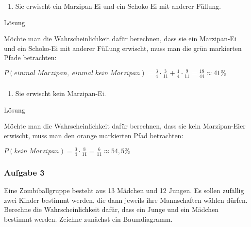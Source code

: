 \documentclass[
  ngerman,
]{book}
\providecommand{\tightlist}{%
  \setlength{\itemsep}{0pt}\setlength{\parskip}{0pt}}
\begin{document}
\begin{enumerate}
\def\labelenumi{\alph{enumi})}
\setcounter{enumi}{1}
\tightlist
\item
  Sie erwischt ein Marzipan-Ei und ein Schoko-Ei mit anderer Füllung.
\end{enumerate}

Lösung

Möchte man die Wahrscheinlichkeit dafür berechnen, dass sie ein Marzipan-Ei und ein Schoko-Ei mit anderer Füllung erwischt, muss man die grün markierten Pfade betrachten:

\(P(einmal\;Marzipan,\;einmal\;kein\;Marzipan)= \frac{3}{4} \cdot \frac{3}{11} + \frac{1}{4} \cdot \frac{9}{11} = \frac{18}{44} \approx 41\%\)

\hypertarget{section-139}{%
\subsubsection*{}\label{section-139}}

\begin{enumerate}
\def\labelenumi{\alph{enumi})}
\setcounter{enumi}{2}
\tightlist
\item
  Sie erwischt kein Marzipan-Ei.
\end{enumerate}

Lösung

Möchte man die Wahrscheinlichkeit dafür berechnen, dass sie kein Marzipan-Eier erwischt, muss man den orange markierten Pfad betrachten:

\(P(kein\;Marzipan)= \frac{3}{4} \cdot \frac{8}{11} = \frac{6}{11} \approx 54,5\%\)

\hypertarget{section-140}{%
\subsubsection*{}\label{section-140}}

\hypertarget{aufgabe-3-8}{%
\subsubsection*{Aufgabe 3}\label{aufgabe-3-8}}

Eine Zombiballgruppe besteht aus 13 Mädchen und 12 Jungen. Es sollen zufällig zwei Kinder bestimmt werden, die dann jeweils ihre Mannschaften wählen dürfen. Berechne die Wahrscheinlichkeit dafür, dass ein Junge und ein Mädchen bestimmt werden. Zeichne zunächst ein Baumdiagramm.
\end{document}

